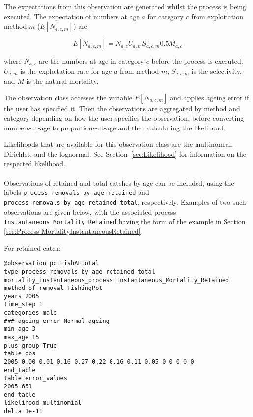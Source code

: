 \begin{itemize}
The expectations from this observation are generated whilst the process is being executed. The expectation of numbers at age $a$ for category $c$ from exploitation method $m$ ($E[N_{a,c,m}]$) are

\begin{equation}
E[N_{a,c,m}] = N_{a,c} U_{a,m} S_{a,c,m} 0.5 M_{a,c}
\end{equation}

where $N_{a,c}$ are the numbers-at-age in category $c$ before the process is executed, $U_{a,m}$ is the exploitation rate for age $a$ from method $m$, $S_{a,c,m}$ is the selectivity, and $M$ is the natural mortality.

The observation class accesses the variable $E[N_{a,c,m}]$ and applies ageing error if the user has specified it. Then the observations are aggregated by method and category depending on how the user specifies the observation, before converting numbers-at-age to proportions-at-age and then calculating the likelihood.

Likelihoods that are available for this observation class are the multinomial, Dirichlet, and the lognormal. See Section~\ref{sec:Likelihood} for information on the respected likelihood.

\paragraph*{} \label{sec:Observation-ProcessRemovalsByAgeRetained} \label{sec:Observation-ProcessRemovalsByAgeRetainedTotal}

Observations of retained and total catches by age can be included, using the labels \texttt{process\_removals\_by\_age\_retained} and \texttt{process\_removals\_by\_age\_retained\_total}, respectively. Examples of two such observations are given below, with the associated process \texttt{Instantaneous\_Mortality\_Retained} having the form of the example in Section \ref{sec:Process-MortalityInstantaneousRetained}.

For retained catch:

{\small{\begin{verbatim}
@observation potFishAFtotal
type process_removals_by_age_retained_total
mortality_instantaneous_process Instantaneous_Mortality_Retained
method_of_removal FishingPot
years 2005
time_step 1
categories male
### ageing_error Normal_ageing
min_age 3
max_age 15
plus_group True
table obs
2005 0.00 0.01 0.16 0.27 0.22 0.16 0.11 0.05 0 0 0 0 0
end_table
table error_values
2005 651
end_table
likelihood multinomial
delta 1e-11
\end{verbatim}}}


\end{itemize}
